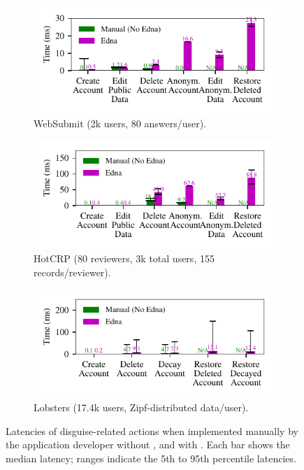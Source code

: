 \begin{figure}[t]
  \centering
  \begin{subfigure}[b]{\columnwidth}
    \includegraphics{figs/websubmit_op_stats}
    \caption{WebSubmit (2k users, 80 answers/user).}
    \label{f:ops-websubmit}
  \end{subfigure}
  \begin{subfigure}[b]{\columnwidth}
    \includegraphics{figs/hotcrp_op_stats}
      \caption{HotCRP (80 reviewers, 3k total users, 155 records/reviewer).}
    \label{f:ops-hotcrp}
  \end{subfigure}
  \begin{subfigure}[b]{\columnwidth}
    \includegraphics{figs/lobsters_op_stats}
    \caption{Lobsters (17.4k users, Zipf-distributed data/user).}
    \label{f:ops-lobsters}
  \end{subfigure}
  \caption{Latencies of disguise-related actions when implemented manually by the
  application developer without \sys, and with \sys.
  Each bar shows the median latency; ranges indicate the 5th to 95th
  percentile latencies.}
  \label{fig:client_opstats}
\end{figure}

